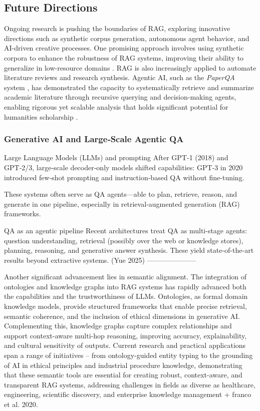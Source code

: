 \begin{spacing}{1.5}
\section{Future Directions}
Ongoing research is pushing the boundaries of RAG, exploring innovative directions such as synthetic corpus generation, autonomous agent behavior, and AI-driven creative processes. One promising approach involves using synthetic corpora to enhance the robustness of RAG systems, improving their ability to generalize in low-resource domains \citep{bor-woei_generative_2024}. RAG is also increasingly applied to automate literature reviews and research synthesis. Agentic AI, such as the \textit{PaperQA} system \citep{lala_paperqa_2023}, has demonstrated the capacity to systematically retrieve and summarize academic literature through recursive querying and decision-making agents, enabling rigorous yet scalable analysis that holds significant potential for humanities scholarship \citep{han_automating_2024}.

\subsubsection*{Generative AI and Large‑Scale Agentic QA}
Large Language Models (LLMs) and prompting
After GPT‑1 (2018) and GPT‑2/3, large-scale decoder‑only models shifted capabilities: GPT‑3 in 2020 introduced few‑shot prompting and instruction‑based QA without fine-tuning.

These systems often serve as QA agents—able to plan, retrieve, reason, and generate in one pipeline, especially in retrieval‑augmented generation (RAG) frameworks.

QA as an agentic pipeline
Recent architectures treat QA as multi-stage agents: question understanding, retrieval (possibly over the web or knowledge stores), planning, reasoning, and generative answer synthesis. These yield state-of-the-art results beyond extractive systems.
(Yue 2025)
---------------------

Another significant advancement lies in semantic alignment. The integration of ontologies and knowledge graphs into RAG systems has rapidly advanced both the capabilities and the trustworthiness of LLMs. Ontologies, as formal domain knowledge models, provide structured frameworks that enable precise retrieval, semantic coherence, and the inclusion of ethical dimensions in generative AI. Complementing this, knowledge graphs capture complex relationships and support context-aware multi-hop reasoning, improving accuracy, explainability, and cultural sensitivity of outputs. Current research and practical applications span a range of initiatives – from ontology-guided entity typing to the grounding of AI in ethical principles and industrial procedure knowledge, demonstrating that these semantic tools are essential for creating robust, context-aware, and transparent RAG systems, addressing challenges in fields as diverse as healthcare, engineering, scientific discovery, and enterprise knowledge management \citep{tiwari_ontorag_2025, ludwig_ontology-based_2025, bran_ontology-retrieval_2024, sharma_og-rag_2024, xiao_orag_2024, park_ontology-based_2024, debellis_integrating_2024} + franco et al. 2020.


\end{spacing}
